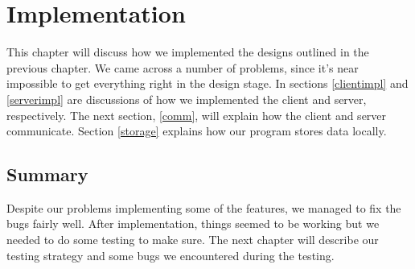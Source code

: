 \chapter{Implementation}
\label{implementation}

This chapter will discuss how we implemented the designs outlined in the previous chapter. We came across a number of problems, since it's near impossible to get everything right in the design stage. In sections \ref{clientimpl} and \ref{serverimpl} are discussions of how we implemented the client and server, respectively. The next section, \ref{comm}, will explain how the client and server communicate. Section \ref{storage} explains how our program stores data locally.











\section{Summary}
Despite our problems implementing some of the features, we managed to fix the bugs fairly well. After implementation, things seemed to be working but we needed to do some testing to make sure. The next chapter will describe our testing strategy and some bugs we encountered during the testing.
